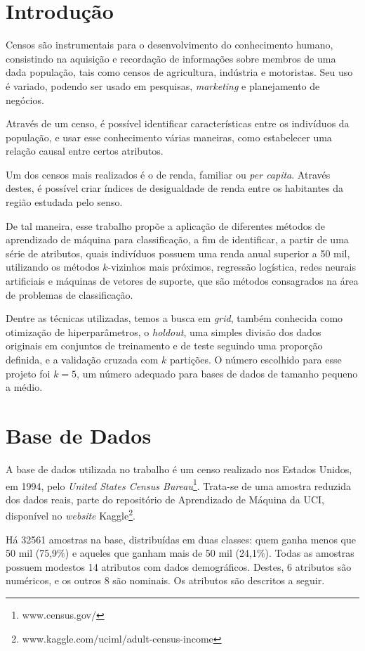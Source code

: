 \documentclass[10pt, conference, compsocconf]{IEEEtran}
\begin{document}
\section{Introdução}
Censos são instrumentais para o desenvolvimento do conhecimento humano, consistindo na aquisição e recordação de informações sobre membros de uma dada população, tais como censos de agricultura, indústria e motoristas. Seu uso é variado, podendo ser usado em pesquisas, \textit{marketing} e planejamento de negócios. 

Através de um censo, é possível identificar características entre os indivíduos da população, e usar esse conhecimento várias maneiras, como estabelecer uma relação causal entre certos atributos.

Um dos censos mais realizados é o de renda, familiar ou \textit{per capita}. Através destes, é possível criar índices de desigualdade de renda entre os habitantes da região estudada pelo senso.

De tal maneira, esse trabalho propõe a aplicação de diferentes métodos de aprendizado de máquina para classificação, a fim de identificar, a partir de uma série de atributos, quais indivíduos possuem uma renda anual superior a 50 mil, utilizando os métodos $k$-vizinhos mais próximos, regressão logística, redes neurais artificiais e máquinas de vetores de suporte, que são métodos consagrados na área de problemas de classificação.

Dentre as técnicas utilizadas, temos a busca em \textit{grid}, também conhecida como otimização de hiperparâmetros, o \textit{holdout}, uma simples divisão dos dados originais em conjuntos de treinamento e de teste seguindo uma proporção definida, e a validação cruzada com $k$ partições. O número escolhido para esse projeto foi $k = 5$, um número adequado para bases de dados de tamanho pequeno a médio.

\section{Base de Dados}
A base de dados utilizada no trabalho é um censo realizado nos Estados Unidos, em 1994, pelo \textit{United States Census Bureau}\footnote{www.census.gov/}. Trata-se de uma amostra reduzida dos dados reais, parte do repositório de Aprendizado de Máquina da UCI, disponível no \textit{website} Kaggle\footnote{www.kaggle.com/uciml/adult-census-income}. 

Há 32561 amostras na base, distribuídas em duas classes: quem ganha menos que 50 mil (75,9\%) e aqueles que ganham mais de 50 mil (24,1\%). Todas as amostras possuem modestos 14 atributos com dados demográficos. Destes, 6 atributos são numéricos, e os outros 8 são nominais. Os atributos são descritos a seguir.
\end{document}
